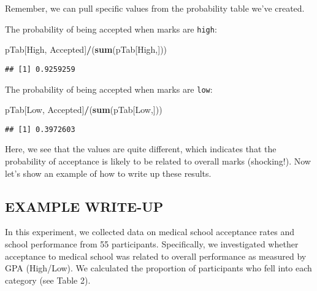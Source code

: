 \documentclass[
]{article}
\newenvironment{Shaded}{\begin{snugshade}}{\end{snugshade}}
\newcommand{\FunctionTok}[1]{\textcolor[rgb]{0.13,0.29,0.53}{\textbf{#1}}}
\newcommand{\NormalTok}[1]{#1}
\newcommand{\SpecialCharTok}[1]{\textcolor[rgb]{0.81,0.36,0.00}{\textbf{#1}}}
\newcommand{\StringTok}[1]{\textcolor[rgb]{0.31,0.60,0.02}{#1}}
\begin{document}
Remember, we can pull specific values from the probability table we've
created.

The probability of being accepted when marks are \texttt{high}:

\begin{Shaded}
\begin{Highlighting}[]
\NormalTok{pTab[}\StringTok{\textquotesingle{}High\textquotesingle{}}\NormalTok{, }\StringTok{\textquotesingle{}Accepted\textquotesingle{}}\NormalTok{]}\SpecialCharTok{/}\NormalTok{(}\FunctionTok{sum}\NormalTok{(pTab[}\StringTok{\textquotesingle{}High\textquotesingle{}}\NormalTok{,]))}
\end{Highlighting}
\end{Shaded}

\begin{verbatim}
## [1] 0.9259259
\end{verbatim}

The probability of being accepted when marks are \texttt{low}:

\begin{Shaded}
\begin{Highlighting}[]
\NormalTok{pTab[}\StringTok{\textquotesingle{}Low\textquotesingle{}}\NormalTok{, }\StringTok{\textquotesingle{}Accepted\textquotesingle{}}\NormalTok{]}\SpecialCharTok{/}\NormalTok{(}\FunctionTok{sum}\NormalTok{(pTab[}\StringTok{\textquotesingle{}Low\textquotesingle{}}\NormalTok{,]))}
\end{Highlighting}
\end{Shaded}

\begin{verbatim}
## [1] 0.3972603
\end{verbatim}

Here, we see that the values are quite different, which indicates that
the probability of acceptance is likely to be related to overall marks
(shocking!). Now let's show an example of how to write up these results.

\hypertarget{example-write-up}{%
\subsection{EXAMPLE WRITE-UP}\label{example-write-up}}

In this experiment, we collected data on medical school acceptance rates
and school performance from 55 participants. Specifically, we
investigated whether acceptance to medical school was related to overall
performance as measured by GPA (High/Low). We calculated the proportion
of participants who fell into each category (see Table 2).
\end{document}
